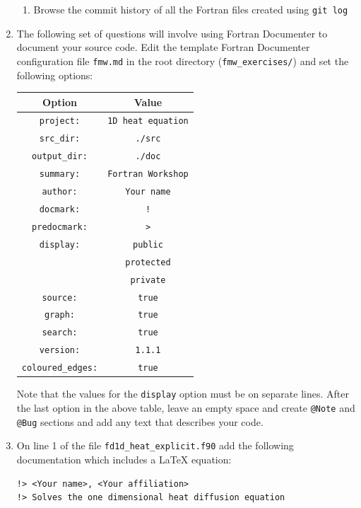 \documentclass[12pt]{article}
\begin{document}
\begin{enumerate}
\begin{enumerate}
\item Browse the commit history of all the Fortran files created using \texttt{git log}
\end{enumerate}
\item The following set of questions will involve using Fortran Documenter to document your source code. 
Edit the template Fortran Documenter configuration file \texttt{fmw.md} in the root directory
(\texttt{fmw\_exercises/}) and set the following options:
\begin{center}
\begin{tabular}{| c | c |} \hline
{\bf Option} & {\bf Value} \\ \hline
\texttt{project:} & \texttt{1D heat equation} \\ \hline
\texttt{src\_dir:} & \texttt{./src} \\ \hline
\texttt{output\_dir:} & \texttt{./doc} \\ \hline
\texttt{summary:} & \texttt{Fortran Workshop} \\ \hline
\texttt{author:} & \texttt{Your name} \\ \hline
\texttt{docmark:} & \texttt{!} \\ \hline
\texttt{predocmark:} & \texttt{>} \\ \hline
\texttt{display:} & \texttt{public} \\ 
                  & \texttt{protected} \\ 
                  & \texttt{private} \\ \hline
\texttt{source:} & \texttt{true} \\ \hline
\texttt{graph:} & \texttt{true} \\ \hline
\texttt{search:} & \texttt{true} \\ \hline
\texttt{version:} & \texttt{1.1.1} \\ \hline
\texttt{coloured\_edges:} & \texttt{true} \\ \hline
\end{tabular}
\end{center}
Note that the values for the \texttt{display} option must be on separate lines.
After the last option in the above table, leave an empty space and create \texttt{@Note} and \texttt{@Bug}
sections and add any text that describes your code.
\item On line 1 of the file \texttt{fd1d\_heat\_explicit.f90} add the following documentation which includes
  a LaTeX equation:
\begin{verbatim} 
!> <Your name>, <Your affiliation>
!> Solves the one dimensional heat diffusion equation

\end{verbatim}
\end{enumerate}
\end{document}
